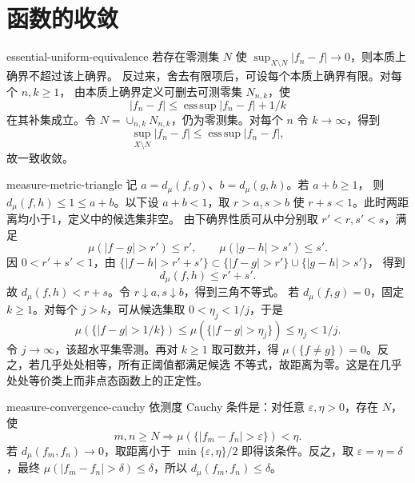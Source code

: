 \chapter{函数的收敛}

\begin{solution}{essential-uniform-equivalence}
若存在零测集 \(N\) 使
\(\sup_{X\setminus N}|f_n-f|\to0\)，则本质上确界不超过该上确界。
反过来，舍去有限项后，可设每个本质上确界有限。对每个 \(n,k\ge1\)，
由本质上确界定义可删去可测零集 \(N_{n,k}\)，使
\[
 |f_n-f|\le\operatorname*{ess\,sup}|f_n-f|+1/k
\]
在其补集成立。令 \(N=\cup_{n,k}N_{n,k}\)，仍为零测集。对每个 \(n\)
令 \(k\to\infty\)，得到
\[
 \sup_{X\setminus N}|f_n-f|
 \le\operatorname*{ess\,sup}|f_n-f|,
\]
故一致收敛。
\end{solution}

\begin{solution}{measure-metric-triangle}
记 \(a=d_\mu(f,g)\)、\(b=d_\mu(g,h)\)。若 \(a+b\ge1\)，
则 \(d_\mu(f,h)\le1\le a+b\)。以下设 \(a+b<1\)，取
\(r>a,s>b\) 使 \(r+s<1\)。此时两距离均小于1，定义中的候选集非空。
由下确界性质可从中分别取 \(r'<r,s'<s\)，满足
\[
 \mu(|f-g|>r')\le r',\qquad
 \mu(|g-h|>s')\le s'.
\]
因 \(0<r'+s'<1\)，由
\(\{|f-h|>r'+s'\}\subset\{|f-g|>r'\}\cup\{|g-h|>s'\}\)，
得到
\[
 d_\mu(f,h)\le r'+s'.
\]
故 \(d_\mu(f,h)<r+s\)。令 \(r\downarrow a,s\downarrow b\)，得到三角不等式。
若 \(d_\mu(f,g)=0\)，固定 \(k\ge1\)。对每个 \(j>k\)，可从候选集取
\(0<\eta_j<1/j\)，于是
\[
 \mu(\{|f-g|>1/k\})\le\mu(\{|f-g|>\eta_j\})
 \le\eta_j<1/j.
\]
令 \(j\to\infty\)，该超水平集零测。再对 \(k\ge1\) 取可数并，得
\(\mu(\{f\ne g\})=0\)。反之，若几乎处处相等，所有正阈值都满足候选
不等式，故距离为零。这是在几乎处处等价类上而非点态函数上的正定性。
\end{solution}

\begin{solution}{measure-convergence-cauchy}
依测度 Cauchy 条件是：对任意 \(\varepsilon,\eta>0\)，存在 \(N\)，使
\[
 m,n\ge N\Longrightarrow
 \mu(\{|f_m-f_n|>\varepsilon\})<\eta.
\]
若 \(d_\mu(f_m,f_n)\to0\)，取距离小于
\(\min\{\varepsilon,\eta\}/2\) 即得该条件。反之，取
\(\varepsilon=\eta=\delta\)，最终
\(\mu(|f_m-f_n|>\delta)\le\delta\)，所以
\(d_\mu(f_m,f_n)\le\delta\)。
\end{solution}

